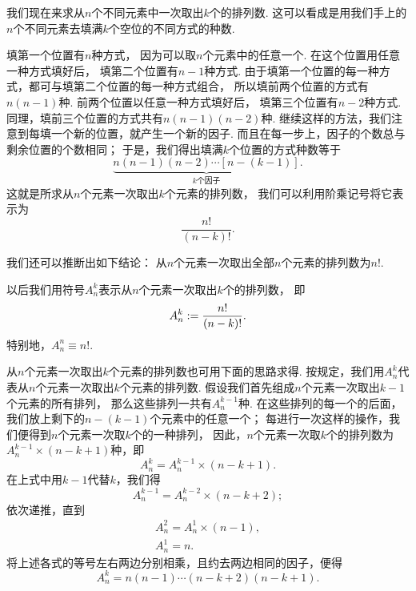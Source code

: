 我们现在来求从\(n\)个不同元素中一次取出\(k\)个的排列数.
这可以看成是用我们手上的\(n\)个不同元素去填满\(k\)个空位的不同方式的种数.

填第一个位置有\(n\)种方式，
因为可以取\(n\)个元素中的任意一个.
在这个位置用任意一种方式填好后，
填第二个位置有\(n-1\)种方式.
由于填第一个位置的每一种方式，都可与填第二个位置的每一种方式组合，
所以填前两个位置的方式有\(n(n-1)\)种.
前两个位置以任意一种方式填好后，
填第三个位置有\(n-2\)种方式.
同理，填前三个位置的方式共有\(n(n-1)(n-2)\)种.
继续这样的方法，我们注意到每填一个新的位置，就产生一个新的因子.
而且在每一步上，因子的个数总与剩余位置的个数相同；
于是，我们得出填满\(k\)个位置的方式种数等于\begin{equation*}
	\underbrace{n(n-1)(n-2)\dotsm[n-(k-1)]}_{\text{$k$个因子}}.
\end{equation*}
这就是所求从\(n\)个元素一次取出\(k\)个元素的排列数，
我们可以利用阶乘记号将它表示为\begin{equation*}
	\frac{n!}{(n-k)!}.
\end{equation*}

我们还可以推断出如下结论：
从\(n\)个元素一次取出全部\(n\)个元素的排列数为\(n!\).

以后我们用符号\(A_n^k\)表示从\(n\)个元素一次取出\(k\)个的排列数，
即\begin{equation}
	A_n^k := \frac{n!}{(n-k)!}.
\end{equation}
特别地，\(A_n^n \equiv n!\).

从\(n\)个元素一次取出\(k\)个元素的排列数也可用下面的思路求得.
按规定，我们用\(A_n^k\)代表从\(n\)个元素一次取出\(k\)个元素的排列数.
假设我们首先组成\(n\)个元素一次取出\(k-1\)个元素的所有排列，
那么这些排列一共有\(A_n^{k-1}\)种.
在这些排列的每一个的后面，我们放上剩下的\(n-(k-1)\)个元素中的任意一个；
每进行一次这样的操作，我们便得到\(n\)个元素一次取\(k\)个的一种排列，
因此，\(n\)个元素一次取\(k\)个的排列数为\(A_n^{k-1} \times (n-k+1)\)种，即\begin{equation*}
	A_n^k = A_n^{k-1} \times (n-k+1).
\end{equation*}
在上式中用\(k-1\)代替\(k\)，我们得\begin{equation*}
	A_n^{k-1} = A_n^{k-2} \times (n-k+2);
\end{equation*}
依次递推，直到\begin{gather*}
	A_n^2 = A_n^1 \times (n-1), \\
	A_n^1 = n.
\end{gather*}
将上述各式的等号左右两边分别相乘，且约去两边相同的因子，便得\begin{equation*}
	A_n^k = n(n-1)\dotsm(n-k+2)(n-k+1).
\end{equation*}

